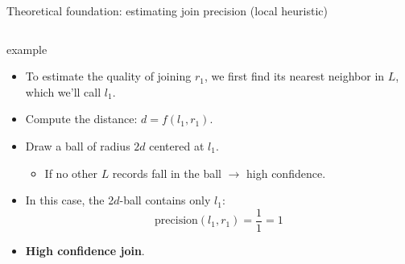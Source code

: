 \documentclass[8pt]{beamer} %
\begin{document}
\begin{frame}{Theoretical foundation: estimating join precision (local heuristic)}
\begin{columns}
\begin{column}{0.4\textwidth}
\begin{beamercolorbox}[rounded=true, shadow=true, leftskip=1em, rightskip=1em]{example}
				\begin{itemize}
					\item To estimate the quality of joining $r_1$, we first find its nearest neighbor in $L$, which we’ll call $l_1$.
					\item Compute the distance: $d = f(l_1, r_1)$.
					\item Draw a ball of radius $2d$ centered at $l_1$.
					\begin{itemize}
						\item If no other $L$ records fall in the ball $\rightarrow$ high confidence.
					\end{itemize}
					\item In this case, the 2$d$-ball contains only $l_1$:
					$$
					\text{precision}(l_1, r_1) = \frac{1}{1} = 1
					$$
					\item \textbf{High confidence join}.
				\end{itemize}

			\end{beamercolorbox}
		\end{column}
	\end{columns}
\end{frame}
	
\end{document}
